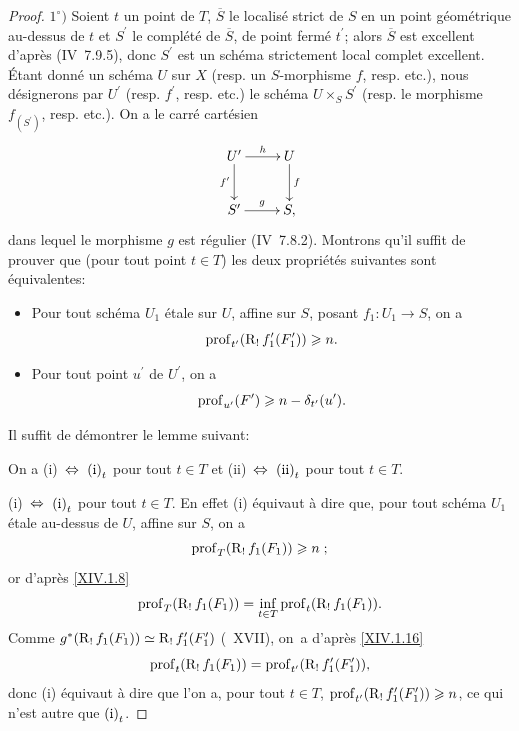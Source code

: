 \begin{proof}
$1^\circ)$ Soient $t$ un point de $T$, $\overline{S}$ le localis\'e strict de $S$ en un point g\'eom\'etrique au-dessus de $t$ et $S^{\prime}$ le compl\'et\'e de $\overline{S}$, de point ferm\'e $t^{\prime}$; alors $\overline{S}$ est excellent d'apr\`es (\EGA IV~7.9.5), donc $S^{\prime}$ est un sch\'ema strictement local complet excellent. \'Etant donn\'e un sch\'ema $U$ sur $X$ (resp. un $S$-morphisme $f$, resp. etc.), nous d\'esignerons par $U^{\prime}$ (resp. $f^{\prime}$, resp. etc.) le sch\'ema $U\times_{S}S^{\prime}$ (resp. le morphisme $f_{(S^{\prime})}$, resp. etc.). On a le carr\'e cart\'esien
$$
\xymatrix{ U^{\prime}\ar[r]^-{h}\ar[d]_-{f^{\prime}} & U\ar[d]^-{f}\\
S^{\prime}\ar[r]^-{g} & S, }
$$
dans lequel le morphisme $g$ est r\'egulier (\EGA IV~7.8.2). Montrons qu'il suffit de prouver que (pour tout point $t\in T$) les deux propri\'et\'es suivantes sont \'equivalentes:
\begin{itemize}
\item[$\textup{(i)}_{t}$] Pour tout sch\'ema $U_{1}$ \'etale sur $U$, affine sur $S$, posant $f_{1}\colon U_{1}\to S$, on a
$$
\operatorname{prof}_{t^{\prime}}(\operatorname{R}_{!}f_{1}^{\prime}(F_{1}^{\prime}))\geqslant n.
$$

\item[$\textup{(ii)}_{t}$] Pour tout point $u^{\prime}$ de $U^{\prime}$, on a
$$
\operatorname{prof}_{u^{\prime}}(F^{\prime})\geqslant n-\delta_{t^{\prime}}(u^{\prime}).
$$
\end{itemize}
Il suffit de d\'emontrer le lemme suivant:

\begin{sublemme} \label{XIV.4.2.1}
On a \textup{(i)}~$\Ssi$~$\textup{(i)}_{t}$ pour tout $t\in T$ et \textup{(ii)}~$\Ssi$~$\textup{(ii)}_{t}$ pour tout $t\in T$.
\end{sublemme}

\textup{(i)}~$\Ssi$~$\textup{(i)}_{t}$ pour tout $t\in T$. En effet \textup{(i)} \'equivaut \`a dire que, pour tout sch\'ema $U_{1}$ \'etale au-dessus de $U$, affine sur $S$, on a
$$
\operatorname{prof}_{T}(\operatorname{R}_{!}f_{1}(F_{1}))\geqslant n\;;$$
or d'apr\`es \ref{XIV.1.8}
$$
\operatorname{prof}_{T}(\operatorname{R}_{!}f_{1}(F_{1}))=\inf_{t\in T}\operatorname{prof}_{t}(\operatorname{R}_{!}f_{1}(F_{1})).
$$
Comme $g^{\ast}(\operatorname{R}_{!}f_{1}(F_{1}))\simeq\operatorname{R}_{!}f_{1}^{\prime}(F_{1}^{\prime})$ (~XVII), on~a d'apr\`es \ref{XIV.1.16}
$$
\operatorname{prof}_{t}(\operatorname{R}_{!}f_{1}(F_{1}))=\operatorname{prof}_{t^{\prime}}(\operatorname{R}_{!}f_{1}^{\prime}(F_{1}^{\prime})),
$$
donc \textup{(i)} \'equivaut \`a dire que l'on a, pour tout $t\in T$, $\operatorname{prof}_{t^{\prime}}(\operatorname{R}_{!}f_{1}^{\prime}(F_{1}^{\prime}))\geqslant n$, ce qui n'est autre que $\textup{(i)}_{t}$.


\end{proof}
